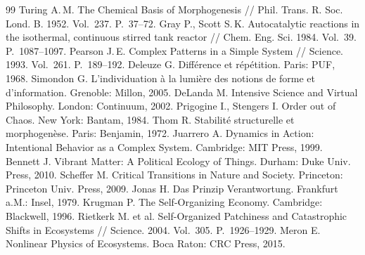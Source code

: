 \documentclass[11pt]{article}
\begin{document}
\begin{thebibliography}{99}\small
{} Turing A.\,M. The Chemical Basis of Morphogenesis // Phil. Trans. R. Soc. Lond. B. 1952. Vol.~237. P.~37–72.
 Gray P., Scott S.\,K. Autocatalytic reactions in the isothermal, continuous stirred tank reactor // Chem. Eng. Sci. 1984. Vol.~39. P.~1087–1097.
 Pearson J.\,E. Complex Patterns in a Simple System // Science. 1993. Vol.~261. P.~189–192.
 Deleuze G. Différence et répétition. Paris: PUF, 1968.
 Simondon G. L'individuation à la lumière des notions de forme et d'information. Grenoble: Millon, 2005.
 DeLanda M. Intensive Science and Virtual Philosophy. London: Continuum, 2002.
 Prigogine I., Stengers I. Order out of Chaos. New York: Bantam, 1984.
 Thom R. Stabilité structurelle et morphogenèse. Paris: Benjamin, 1972.
 Juarrero A. Dynamics in Action: Intentional Behavior as a Complex System. Cambridge: MIT Press, 1999.
 Bennett J. Vibrant Matter: A Political Ecology of Things. Durham: Duke Univ. Press, 2010.
 Scheffer M. Critical Transitions in Nature and Society. Princeton: Princeton Univ. Press, 2009.
 Jonas H. Das Prinzip Verantwortung. Frankfurt a.M.: Insel, 1979.
 Krugman P. The Self-Organizing Economy. Cambridge: Blackwell, 1996.
 Rietkerk M. et al. Self-Organized Patchiness and Catastrophic Shifts in Ecosystems // Science. 2004. Vol.~305. P.~1926–1929.
 Meron E. Nonlinear Physics of Ecosystems. Boca Raton: CRC Press, 2015.
\end{thebibliography}
\end{document}
